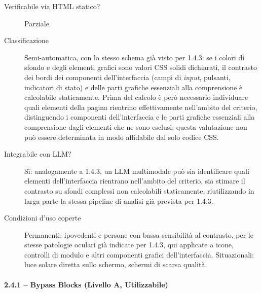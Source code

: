 \begin{description}

\item[Verificabile via HTML statico?] Parziale.

\item[Classificazione] Semi-automatica, con lo stesso schema già visto per 1.4.3: se i colori di sfondo e degli elementi grafici sono valori CSS solidi dichiarati, il contrasto dei bordi dei componenti dell'interfaccia (campi di \emph{input}, pulsanti, indicatori di stato) e delle parti grafiche essenziali alla comprensione è calcolabile staticamente. Prima del calcolo è però necessario individuare quali elementi della pagina rientrino effettivamente nell'ambito del criterio, distinguendo i componenti dell'interfaccia e le parti grafiche essenziali alla comprensione dagli elementi che ne sono esclusi; questa valutazione non può essere determinata in modo affidabile dal solo codice CSS.

\item[Integrabile con LLM?] Sì: analogamente a 1.4.3, un LLM multimodale può sia identificare quali elementi dell'interfaccia rientrano nell'ambito del criterio, sia stimare il contrasto su sfondi complessi non calcolabili staticamente, riutilizzando in larga parte la stessa pipeline di analisi già prevista per 1.4.3.

\item[Condizioni d'uso coperte] Permanenti: ipovedenti e persone con bassa sensibilità al contrasto, per le stesse patologie oculari già indicate per 1.4.3, qui applicate a icone, controlli di modulo e altri componenti grafici dell'interfaccia. Situazionali: luce solare diretta sullo schermo, schermi di scarsa qualità.

\end{description}

\paragraph*{2.4.1 -- Bypass Blocks (Livello A, Utilizzabile)}

